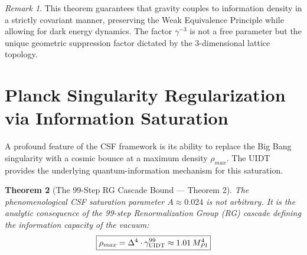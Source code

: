 \documentclass[12pt,a4paper,twoside]{article}
\theoremstyle{plain}
\newtheorem{theorem}{Theorem}[section]
\theoremstyle{definition}
\theoremstyle{remark}
\newtheorem{remark}[theorem]{Remark}
\newcommand{\UIDT}{\textsc{UIDT}}
\newcommand{\CSF}{\textsc{CSF}}
\begin{document}
\begin{remark}
This theorem guarantees that gravity couples to information density in a
strictly covariant manner, preserving the Weak Equivalence Principle while
allowing for dark energy dynamics. The factor $\gamma^{-3}$ is not a free
parameter but the unique geometric suppression factor dictated by the
3-dimensional lattice topology.
\end{remark}


\section{Planck Singularity Regularization via Information Saturation}
\label{sec:saturation}

A profound feature of the \CSF{} framework is its ability to replace the
Big Bang singularity with a cosmic bounce at a maximum density
$\rho_{max}$. The \UIDT{} provides the underlying quantum-information
mechanism for this saturation.

\begin{theorem}[The 99-Step RG Cascade Bound --- Theorem 2]
\label{thm:rg_cascade}
The phenomenological \CSF{} saturation parameter $A \approx 0.024$ is not
arbitrary. It is the analytic consequence of the 99-step Renormalization
Group (RG) cascade defining the information capacity of the vacuum:
\begin{equation}
\boxed{
    \rho_{max} = \Delta^4 \cdot \gamma_{\UIDT}^{99}
    \approx 1.01\,M_{Pl}^4
}
\label{eq:saturation_bound}
\end{equation}
\end{theorem}
\end{document}
